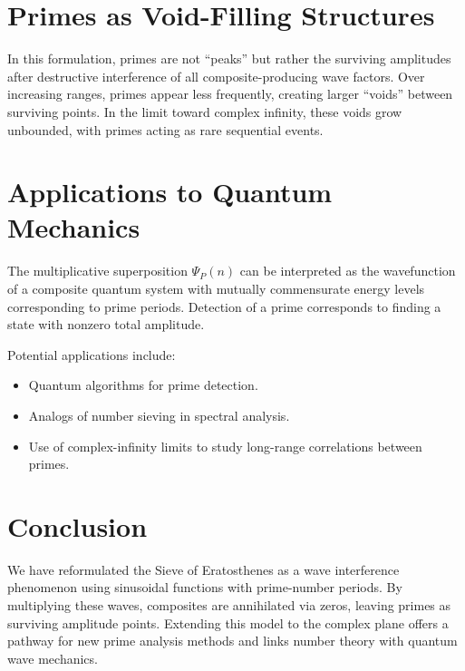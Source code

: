 \documentclass[12pt]{article}
\begin{document}
\section{Primes as Void-Filling Structures}
In this formulation, primes are not “peaks” but rather the surviving amplitudes after destructive interference of all composite-producing wave factors. Over increasing ranges, primes appear less frequently, creating larger “voids” between surviving points. In the limit toward complex infinity, these voids grow unbounded, with primes acting as rare sequential events.

\section{Applications to Quantum Mechanics}
The multiplicative superposition $\Psi_P(n)$ can be interpreted as the wavefunction of a composite quantum system with mutually commensurate energy levels corresponding to prime periods. Detection of a prime corresponds to finding a state with nonzero total amplitude.

Potential applications include:
\begin{itemize}
    \item Quantum algorithms for prime detection.
    \item Analogs of number sieving in spectral analysis.
    \item Use of complex-infinity limits to study long-range correlations between primes.
\end{itemize}

\section{Conclusion}
We have reformulated the Sieve of Eratosthenes as a wave interference phenomenon using sinusoidal functions with prime-number periods. By multiplying these waves, composites are annihilated via zeros, leaving primes as surviving amplitude points. Extending this model to the complex plane offers a pathway for new prime analysis methods and links number theory with quantum wave mechanics.
\end{document}
